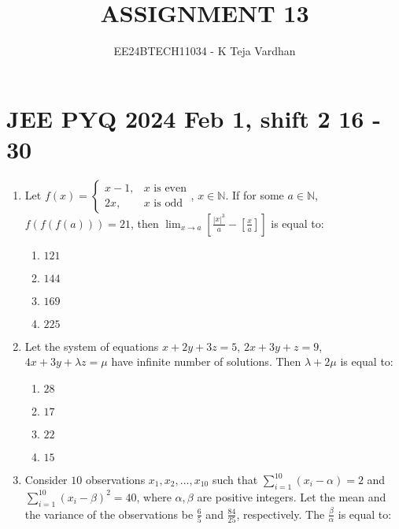 \documentclass[journal]{IEEEtran}
\newcommand{\brak}[1]{\left( #1 \right)}
\begin{document}

\title{ASSIGNMENT 13}
\author{EE24BTECH11034 - K Teja Vardhan}
{\let\newpage\relax\maketitle}

\section{JEE PYQ 2024 Feb 1, shift 2  16 - 30}
\begin{enumerate}

    \item Let $f(x)=\begin{cases}
    x-1, & x\text{ is even} \\
    2x, & x\text{ is odd}
    \end{cases}$, $x\in\mathbb{N}$. If for some $a\in\mathbb{N}$, $f(f(f(a)))=21$, then $\lim_{x\to a}\left[\frac{|x|^{3}}{a}-\left[\frac{x}{a}\right]\right]$ is equal to:
    
        \begin{multicols}{4}
        \begin{enumerate}
        \item $121$
        \item $144$
        \item $169$
        \item $225$
        \end{enumerate}
        \end{multicols}
    
    \item Let the system of equations $x+2y+3z=5$, $2x+3y+z=9$, $4x+3y+\lambda z=\mu$ have infinite number of solutions. Then $\lambda+2\mu$ is equal to:
        
        \begin{multicols}{4}
        \begin{enumerate}
        \item $28$
        \item $17$
        \item $22$
        \item $15$
        \end{enumerate}
        \end{multicols}
        
    \item Consider $10$ observations $x_1, x_2, \ldots, x_{10}$ such that $\sum_{i=1}^{10}\brak{x_i-\alpha}=2$ and $\sum_{i=1}^{10}\brak{x_i-\beta}^{2}=40$, where $\alpha, \beta$ are positive integers. Let the mean and the variance of the observations be $\frac{6}{5}$ and $\frac{84}{25}$, respectively. The $\frac{\beta}{\alpha}$ is equal to:
        

\end{enumerate}
\end{document}
